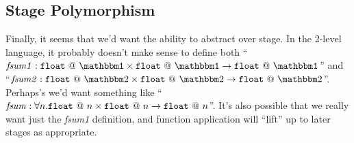 \documentclass[11pt]{article}
\makeatletter
\newcommand {\bbone} {\mathbbm 1}
\newcommand {\bbtwo} {\mathbbm 2}
\newcommand {\at} {{\tt~@~}}
\makeatother
\begin{document}
\subsection {Stage Polymorphism}
Finally, it seems that we'd want the ability to abstract over stage.  In the 2-level language, it probably doesn't make sense to define both ``${\it fsum1} :  {\tt float \at \bbone \times float \at \bbone \to float \at \bbone}$'' and ``${\it fsum2} :  {\tt float} \at \bbtwo \times {\tt float} \at \bbtwo \to {\tt float} \at \bbtwo$''.  Perhaps's we'd want something like  ``${\it fsum} :  \forall n.{\tt float} \at n \times {\tt float} \at n \to {\tt float} \at n$''.  It's also possible that we really want just the {\it fsum1} definition, and function application will ``lift'' up to later stages as appropriate.
\end{document}
